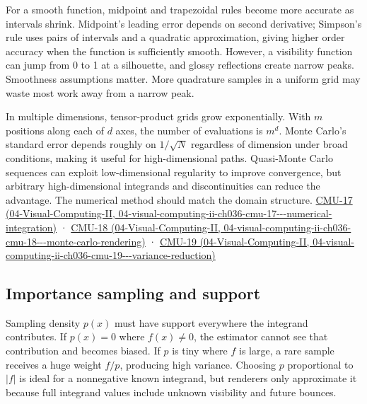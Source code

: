 For a smooth function, midpoint and trapezoidal rules become more accurate as intervals shrink. Midpoint's leading error depends on second derivative; Simpson's rule uses pairs of intervals and a quadratic approximation, giving higher order accuracy when the function is sufficiently smooth. However, a visibility function can jump from 0 to 1 at a silhouette, and glossy reflections create narrow peaks. Smoothness assumptions matter. More quadrature samples in a uniform grid may waste most work away from a narrow peak.

In multiple dimensions, tensor-product grids grow exponentially. With \(m\) positions along each of \(d\) axes, the number of evaluations is \(m^d\). Monte Carlo's standard error depends roughly on \(1/\sqrt{N}\) regardless of dimension under broad conditions, making it useful for high-dimensional paths. Quasi-Monte Carlo sequences can exploit low-dimensional regularity to improve convergence, but arbitrary high-dimensional integrands and discontinuities can reduce the advantage. The numerical method should match the domain structure. \href{../04-Visual-Computing-II/main.pdf\#nameddest=04-visual-computing-ii-ch036-cmu-17---numerical-integration}{CMU-17 (04-Visual-Computing-II, 04-visual-computing-ii-ch036-cmu-17-\/-\/-numerical-integration)} · \href{../04-Visual-Computing-II/main.pdf\#nameddest=04-visual-computing-ii-ch036-cmu-18---monte-carlo-rendering}{CMU-18 (04-Visual-Computing-II, 04-visual-computing-ii-ch036-cmu-18-\/-\/-monte-carlo-rendering)} · \href{../04-Visual-Computing-II/main.pdf\#nameddest=04-visual-computing-ii-ch036-cmu-19---variance-reduction}{CMU-19 (04-Visual-Computing-II, 04-visual-computing-ii-ch036-cmu-19-\/-\/-variance-reduction)}

\subsection{Importance sampling and support}\label{03-visual-computing-i-ch012-importance-sampling-and-support}

Sampling density \(p(x)\) must have support everywhere the integrand contributes. If \(p(x)=0\) where \(f(x)\ne0\), the estimator cannot see that contribution and becomes biased. If \(p\) is tiny where \(f\) is large, a rare sample receives a huge weight \(f/p\), producing high variance. Choosing \(p\) proportional to \(|f|\) is ideal for a nonnegative known integrand, but renderers only approximate it because full integrand values include unknown visibility and future bounces.

